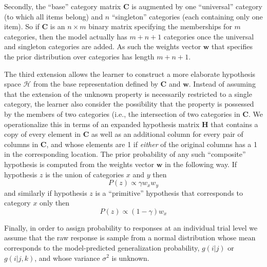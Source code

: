 \documentclass[doc,floatsintext]{apa6}
\begin{document}
Secondly, the ``base'' category matrix $\mathbf{C}$ is augmented by one ``universal'' category (to which all items belong) and $n$ ``singleton'' categories (each containing only one item). So if $\mathbf{C}$ is an $n \times m$ binary matrix specifying the memberships for $m$ categories, then the model actually has $m+n+1$ categories once the universal and singleton categories are added. As such the weights vector $\mathbf{w}$ that specifies the prior distribution over categories has length $m+n+1$.

The third extension allows the learner to construct a more elaborate hypothesis space $\mathcal{H}$ from the base representation defined by $\mathbf{C}$ and $\mathbf{w}$. Instead of assuming that the extension of the unknown property is necessarily restricted to a single category, the learner also consider the possibility that the property is possessed by the members of two categories (i.e., the intersection of two categories in $\mathbf{C}$. We operationalize this in terms of an expanded hypothesis matrix $\mathbf{H}$ that contains a copy of every element in $\mathbf{C}$ as well as an additional column for every pair of columns in $\mathbf{C}$, and whose elements are 1 if {\it either} of the original columns has a 1 in the corresponding location. The prior probability of any such ``composite'' hypothesis is computed from the weights vector $\mathbf{w}$ in the following way. If hypothesis $z$ is the union of categories $x$ and $y$ then
\begin{equation}
P(z) \propto \gamma w_x w_y
\end{equation}
and similarly if hypothesis $z$ is a ``primitive'' hypothesis that corresponds to category $x$ only then
\begin{equation}
P(z) \propto (1-\gamma) w_x
\end{equation}

Finally, in order to assign probability to responses at an individual trial level we assume that the raw response is sample from a normal distribution whose mean corresponds to the model-predicted generalization probability, $g(i|j)$ or $g(i|j,k)$, and whose variance $\sigma^2$ is unknown.
\end{document}

